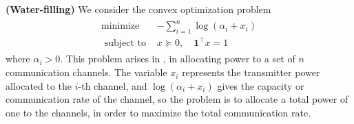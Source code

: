 \documentclass{article}
\newcommand{\bfs}[1]{\textbf{({#1}) }}
\begin{document}
\begin{exma}\bfs{Water-filling}
We consider the convex optimization problem
\begin{align*}
\begin{array}{ll}
\operatorname{minimize} & -\sum_{i=1}^{n} \log \left(\alpha_{i}+x_{i}\right) \\
\text { subject to } & x \succeq 0, \quad \mathbf{1}^{\top} x=1
\end{array}
\end{align*}
where $\alpha_{i}>0$. This problem arises in , in allocating power to a set of $n$ communication channels. The variable $x_{i}$ represents the transmitter power allocated to the $i$-th channel, and $\log \left(\alpha_{i}+x_{i}\right)$ gives the capacity or communication rate of the channel, so the problem is to allocate a total power of one to the channels, in order to maximize the total communication rate.


\end{exma}
\end{document}
